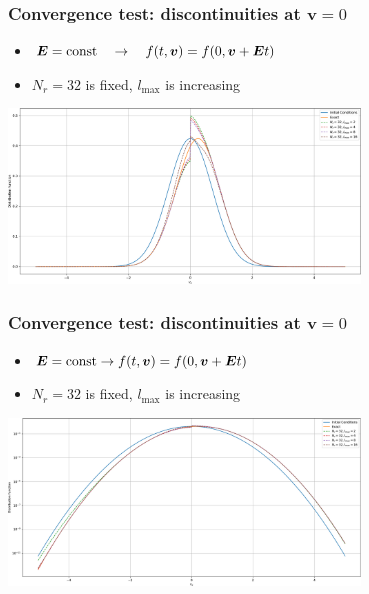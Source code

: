 \documentclass[mathserif, aspectratio=169]{beamer}
\newcommand{\vect}[1]{\boldsymbol{#1}}
\newcommand{\of}[1]{\mleft( #1 \mright)}
\begin{document}
\begin{frame}
\frametitle{Convergence test: discontinuities at $\vect{v} = 0$}
\begin{center}
\begin{itemize}
\item 
$\vect{E} = \text{const} \quad \rightarrow \quad f\of{t,\vect{v}} = f\of{0, \vect{v} + \vect{E}t}$
\item $N_r = 32$ is fixed, $l_{\max}$ is increasing
\end{itemize}
\includegraphics[width=0.7\textwidth]{figures/advection_operator_test_lmax}
\end{center}
\end{frame}

\begin{frame}
\frametitle{Convergence test: discontinuities at $\vect{v} = 0$}
\begin{center}
\begin{itemize}
\item 
$\vect{E} = \text{const} \rightarrow f\of{t,\vect{v}} = f\of{0, \vect{v} + \vect{E}t}$
\item $N_r = 32$ is fixed, $l_{\max}$ is increasing
\end{itemize}
\includegraphics[width=0.7\textwidth]{figures/advection_operator_test_lmax_log}
\end{center}
\end{frame}
\end{document}
